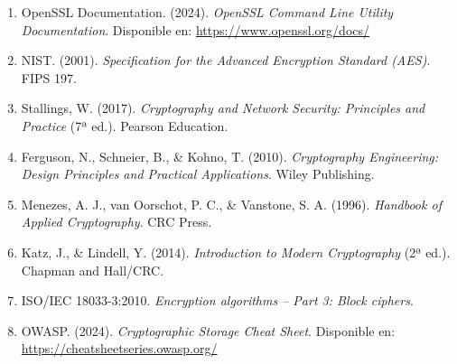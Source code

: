 \documentclass[11pt,a4paper]{article}
\begin{document}
\begin{enumerate}
    \item OpenSSL Documentation. (2024). \textit{OpenSSL Command Line Utility Documentation}.
    Disponible en: \url{https://www.openssl.org/docs/}

    \item NIST. (2001). \textit{Specification for the Advanced Encryption Standard (AES)}.
    FIPS 197.

    \item Stallings, W. (2017). \textit{Cryptography and Network Security: Principles and Practice} (7ª ed.).
    Pearson Education.

    \item Ferguson, N., Schneier, B., \& Kohno, T. (2010). \textit{Cryptography Engineering:
    Design Principles and Practical Applications}. Wiley Publishing.

    \item Menezes, A. J., van Oorschot, P. C., \& Vanstone, S. A. (1996).
    \textit{Handbook of Applied Cryptography}. CRC Press.

    \item Katz, J., \& Lindell, Y. (2014). \textit{Introduction to Modern Cryptography} (2ª ed.).
    Chapman and Hall/CRC.

    \item ISO/IEC 18033-3:2010. \textit{Encryption algorithms -- Part 3: Block ciphers}.

    \item OWASP. (2024). \textit{Cryptographic Storage Cheat Sheet}.
    Disponible en: \url{https://cheatsheetseries.owasp.org/}
\end{enumerate}
\end{document}
